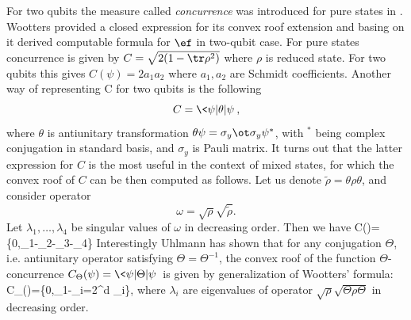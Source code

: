 \documentclass[twocolumn,aps,rmp]{revtex4}
\begin{document}
For two qubits the measure called {\it concurrence} was introduced
for pure states in \cite{Hill-Wootters}. Wootters
\cite{Wootters-conc} provided a closed expression for its convex
roof extension and basing on it derived computable formula for $\ef$
in two-qubit case. For pure states concurrence is given by
$C=\sqrt{2(1- \tr \rho^2)}$ where $\rho$ is reduced state. For two
qubits this gives $C(\psi)=2a_1a_2$ where $a_1,a_2$ are Schmidt
coefficients. Another way of representing C for two qubits is the
following \begin{equation} C=\<\psi|\theta|\psi\>, \end{equation} where $\theta$ is
antiunitary transformation $\theta \psi=\sigma_y\ot \sigma_y
\psi^*$, with ${}^*$ being complex conjugation in standard basis,
and $\sigma_y$ is Pauli matrix. It turns out that the latter
expression for $C$ is the most useful in the context of mixed
states, for which the convex roof of $C$ can be then computed as
follows. Let us denote $\tilde\rho=\theta \rho \theta$, and consider
operator \begin{equation} \omega=\sqrt \rho \sqrt {\tilde \rho}. \end{equation} Let
$\lambda_1,\ldots,\lambda_4$ be singular values of $\omega$ in
decreasing order. Then we have \be
C(\rho)=\max\{0,\lambda_1-\lambda_2-\lambda_3-\lambda_4\}
\label{eq:concurrence} \ee Interestingly Uhlmann has shown
\cite{Uhlmann2000-conj} that for any conjugation $\Theta$, i.e.
antiunitary operator satisfying $\Theta=\Theta^{-1}$, the convex
roof of the function $\Theta$-concurrence
$C_\Theta(\psi)=\<\psi|\Theta|\psi\>$ is given by generalization of
Wootters'  formula: \be
C_\Theta(\rho)=\max\{0,\lambda_1-\sum_{i=2}^d \lambda_i\}, \ee where
$\lambda_i$ are  eigenvalues  of operator $\sqrt {\rho} \sqrt{\Theta
\rho \Theta}$ in decreasing order.
\end{document}
